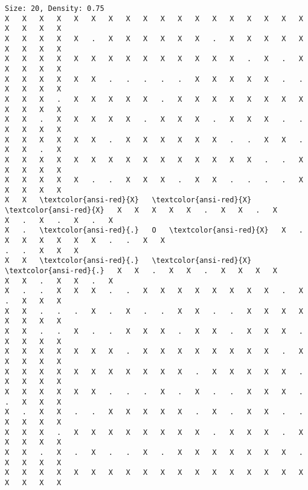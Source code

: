 \documentclass[11pt]{article}
\begin{document}
\begin{Verbatim}[commandchars=\\\{\},fontsize=\footnotesize]
Size: 20, Density: 0.75
X   X   X   X   X   X   X   X   X   X   X   X   X   X   X   X   X   X   X   X   X   X
X   X   X   X   X   .   X   X   X   X   X   X   .   X   X   X   X   X   X   X   X   X
X   X   X   X   X   X   X   X   X   X   X   X   X   X   .   X   .   X   X   X   X   X
X   X   X   X   X   X   .   .   .   .   .   X   X   X   X   X   .   .   X   X   X   X
X   X   X   .   X   X   X   X   X   .   X   X   X   X   X   X   X   X   X   X   X   X
X   X   .   X   X   X   X   X   .   X   X   X   .   X   X   X   .   .   X   X   X   X
X   X   X   X   X   X   .   X   X   X   X   X   X   .   .   X   X   .   X   X   .   X
X   X   X   X   X   X   X   X   X   X   X   X   X   X   X   .   .   X   X   X   X   X
X   X   X   X   X   .   .   X   X   X   .   X   X   .   .   .   .   X   X   X   X   X
X   X   \textcolor{ansi-red}{X}   \textcolor{ansi-red}{X}   \textcolor{ansi-red}{X}   X   X   X   X   X   .   X   X   .   X
X   .   X   .   X   .   X
X   .   \textcolor{ansi-red}{.}   O   \textcolor{ansi-red}{X}   X   .   X   X   X   X   X   X   .   .   X   X
.   .   X   X   X
X   X   \textcolor{ansi-red}{.}   \textcolor{ansi-red}{X}   \textcolor{ansi-red}{.}   X   X   .   X   X   .   X   X   X   X
X   X   .   X   X   .   X
X   .   .   X   X   X   .   .   X   X   X   X   X   X   X   X   .   X   .   X   X   X
X   X   .   .   .   X   .   X   .   .   X   X   .   .   X   X   X   X   X   X   X   X
X   X   .   .   X   .   .   X   X   X   .   X   X   .   X   X   X   .   X   X   X   X
X   X   X   X   X   X   X   .   X   X   X   X   X   X   X   X   .   X   X   X   X   X
X   X   X   X   X   X   X   X   X   X   X   .   X   X   X   X   X   .   X   X   X   X
X   X   X   X   X   X   .   .   .   X   .   X   .   .   X   X   X   .   .   X   X   X
X   .   X   X   .   .   X   X   X   X   X   .   X   .   X   X   .   .   X   X   X   X
X   X   X   .   X   X   X   X   X   X   X   X   .   X   X   X   .   X   X   X   X   X
X   X   .   X   .   X   .   .   X   .   X   X   X   X   X   X   X   .   X   X   X   X
X   X   X   X   X   X   X   X   X   X   X   X   X   X   X   X   X   X   X   X   X   X


    \end{Verbatim}
\newpage
\end{document}
